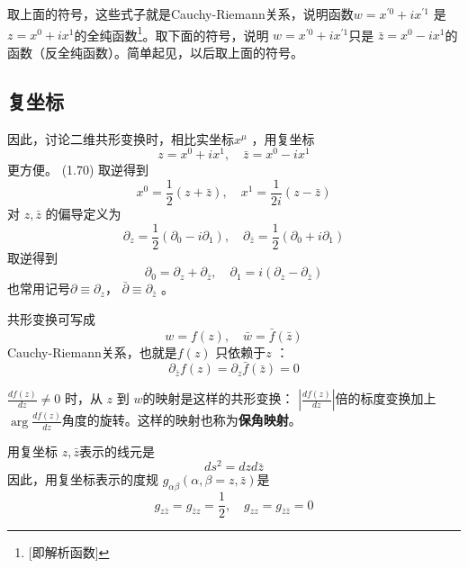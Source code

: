 取上面的符号，这些式子就是Cauchy-Riemann关系，说明函数$ w=x^{\prime 0}+i x^{\prime 1}$ 是 $z=x^{0}+i x^{1} $的全纯函数\footnote{[即解析函数]}。取下面的符号，说明 $w=x^{\prime 0}+i x^{\prime 1} $只是 $\bar{z}=x^{0}-i x^{1} $的函数（反全纯函数）。简单起见，以后取上面的符号。

\subsection{复坐标}

因此，讨论二维共形变换时，相比实坐标$ x^\mu$ ，用复坐标
\begin{equation}
	z=x^{0}+i x^{1}, \quad \bar{z}=x^{0}-i x^{1}
\end{equation}
更方便。 (1.70) 取逆得到
\begin{equation}
	x^{0}=\frac{1}{2}(z+\bar{z}), \quad x^{1}=\frac{1}{2 i}(z-\bar{z})
\end{equation}
对 $z,\bar{z}$ 的偏导定义为
\begin{equation}
	\partial_{z}=\frac{1}{2}\left(\partial_{0}-i \partial_{1}\right), \quad \partial_{\bar{z}}=\frac{1}{2 }\left(\partial_{0}+i \partial_{1}\right)
\end{equation}
取逆得到
\begin{equation}
	\partial_{0}=\partial_{z}+\partial_{\bar{z}}, \quad \partial_{1}=i\left(\partial_{z}-\partial_{\bar{z}}\right)
\end{equation}
也常用记号$ \partial\equiv\partial_z $， $\bar{\partial}\equiv\partial_{\bar{z}}$ 。

共形变换可写成
\begin{equation}
	w=f(z), \quad \bar{w}=\bar{f}(\bar{z})
\end{equation}
Cauchy-Riemann关系，也就是$ f(z)$ 只依赖于$ z$ ：
\begin{equation}
	\partial_{\bar{z}} f(z)=\partial_{z} \bar{f}(\bar{z})=0
\end{equation}

$\frac{d f(z)}{d z} \neq 0$ 时，从 $z$ 到 $w $的映射是这样的共形变换： $\left|\frac{d f(z)}{d z}\right| $倍的标度变换加上 $\arg \frac{d f(z)}{d z} $角度的旋转。这样的映射也称为\textbf{保角映射}。

用复坐标 $z,\bar{z} $表示的线元是
$$
d s^{2}=d z d \bar{z}
$$
因此，用复坐标表示的度规 $g_{\alpha\beta}( \alpha,\beta=z,\bar{z})$是
\begin{equation}
g_{z \bar{z}}=g_{\bar{z} z}=\frac{1}{2}, \quad g_{z z}=g_{\bar{z} \bar{z}}=0
\end{equation}

